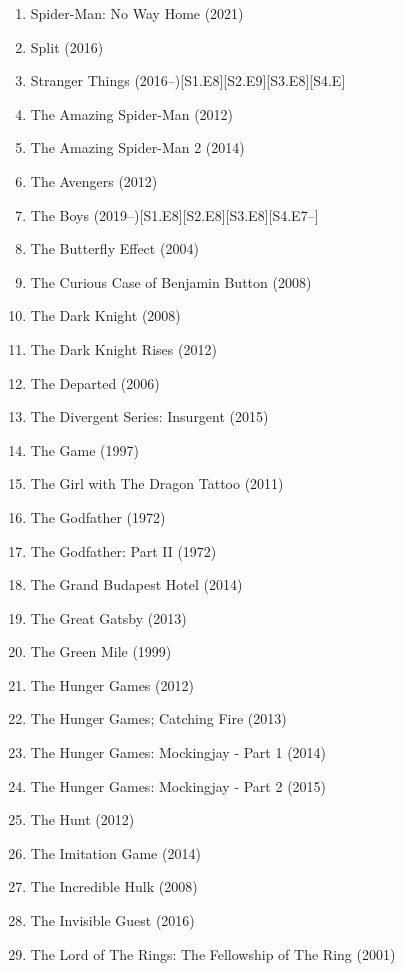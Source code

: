 \documentclass{article}
\begin{document}
\begin{enumerate}
\begin{itemize}
		{\bf Peter B. Parker}: ``{\it You won't. It's a leap of faith. That's all it is, Miles. A leap of faith}.''
	\end{itemize}
	\item {\sc Spider-Man: No Way Home} (2021)
	\item {\sc Split} (2016)
	\item Stranger Things (2016--)\hfill[S1.E8][S2.E9][S3.E8][S4.E]
	\item {\sc The Amazing Spider-Man} (2012)
	\item {\sc The Amazing Spider-Man 2} (2014)
	\item {\sc The Avengers} (2012)
	\item The Boys (2019--)\hfill[S1.E8][S2.E8][S3.E8][S4.E7--]
	\item {\sc The Butterfly Effect} (2004)
	\item {\sc The Curious Case of Benjamin Button} (2008)
	\item {\sc The Dark Knight} (2008)
	\item {\sc The Dark Knight Rises} (2012)
	\item {\sc The Departed} (2006)
	\item {\sc The Divergent Series: Insurgent} (2015)
	\item {\sc The Game} (1997)
	\item {\sc The Girl with The Dragon Tattoo} (2011)
	\item {\sc The Godfather} (1972)
	\item {\sc The Godfather: Part II} (1972)
	\item {\sc The Grand Budapest Hotel} (2014)
	\item {\sc The Great Gatsby} (2013)
	\item {\sc The Green Mile} (1999)
	\item {\sc The Hunger Games} (2012)
	\item {\sc The Hunger Games; Catching Fire} (2013)
	\item {\sc The Hunger Games: Mockingjay - Part 1} (2014)
	\item {\sc The Hunger Games: Mockingjay - Part 2} (2015)
	\item {\sc The Hunt} (2012)
	\item {\sc The Imitation Game} (2014)
	\item {\sc The Incredible Hulk} (2008)
	\item {\sc The Invisible Guest} (2016)
	\item {\sc The Lord of The Rings: The Fellowship of The Ring} (2001)

\end{enumerate}
\end{document}
